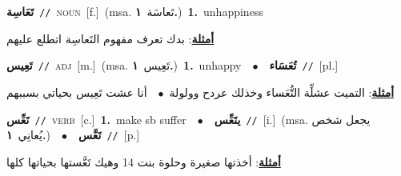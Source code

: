 \documentclass[10pt,a4paper,twoside]{article} %
\begin{document}
\begin{multicols}{2}
{{{{{{{{{{{{\setlength\topsep{0pt}\textbf{\foreignlanguage{arabic}{تَعَاسِة}}\ {\color{gray}\texttt{//}\color{black}}\ \textsc{noun}\ [f.]\ \color{gray}(msa. \foreignlanguage{arabic}{تَعاسَة}~\foreignlanguage{arabic}{\textbf{١.}})\color{black}\ \textbf{1.}~unhappiness\  \begin{flushright}\color{gray}\foreignlanguage{arabic}{\textbf{\underline{\foreignlanguage{arabic}{أمثلة}}}: بدك تعرف مفهوم التَعاسِة اتطلع عليهم}\end{flushright}\color{black}} \vspace{2mm}

{\setlength\topsep{0pt}\textbf{\foreignlanguage{arabic}{تَعِيس}}\ {\color{gray}\texttt{//}\color{black}}\ \textsc{adj}\ [m.]\ \color{gray}(msa. \foreignlanguage{arabic}{تَعِيس}~\foreignlanguage{arabic}{\textbf{١.}})\color{black}\ \textbf{1.}~unhappy\ \ $\bullet$\ \ \setlength\topsep{0pt}\textbf{\foreignlanguage{arabic}{تُعَسَاء}}\ {\color{gray}\texttt{//}\color{black}}\ [pl.]\  \begin{flushright}\color{gray}\foreignlanguage{arabic}{\textbf{\underline{\foreignlanguage{arabic}{أمثلة}}}: التميت عشلِّة التُّعَساء وخذلك عردح وولولة\ $\bullet$\ \  أنا عشت تَعِيس بحياتي بسببهم}\end{flushright}\color{black}} \vspace{2mm}

{\setlength\topsep{0pt}\textbf{\foreignlanguage{arabic}{تَعِّس}}\ {\color{gray}\texttt{//}\color{black}}\ \textsc{verb}\ [c.]\ \textbf{1.}~make sb suffer\ \ $\bullet$\ \ \setlength\topsep{0pt}\textbf{\foreignlanguage{arabic}{يتَعِّس}}\ {\color{gray}\texttt{//}\color{black}}\ [i.]\ \color{gray}(msa. \foreignlanguage{arabic}{يجعل شخص يُعانِي}~\foreignlanguage{arabic}{\textbf{١.}})\color{black}\ \ $\bullet$\ \ \setlength\topsep{0pt}\textbf{\foreignlanguage{arabic}{تَعَّس}}\ {\color{gray}\texttt{//}\color{black}}\ [p.]\  \begin{flushright}\color{gray}\foreignlanguage{arabic}{\textbf{\underline{\foreignlanguage{arabic}{أمثلة}}}: أخذتها صغيرة وحلوة بنت 14 وهيك تَعَّستها بحياتها كلها}\end{flushright}\color{black}} \vspace{2mm}

}}}}}}}}}}}
\end{multicols}
\end{document}
